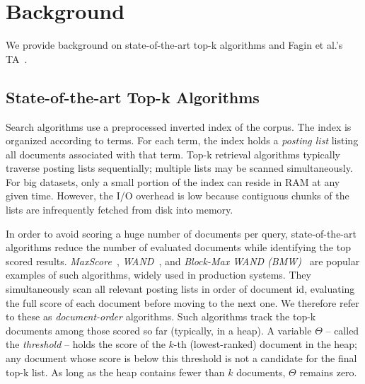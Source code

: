 
\section{Background}
\label{sec:background}

We  provide background on  state-of-the-art top-k algorithms and Fagin et al.'s TA~\cite{Fagin:2003}.

\subsection{State-of-the-art Top-k Algorithms}

Search algorithms use a preprocessed inverted index of the corpus. The index is organized according to terms. For each term, the index holds a \emph{posting list} listing all documents associated with that term. Top-k retrieval algorithms typically traverse  posting lists sequentially; multiple lists may be scanned simultaneously. For big datasets, only a small portion of the index can reside in RAM at any given time. However, the I/O overhead is low because 
contiguous chunks of the lists are infrequently fetched from disk into memory.

In order to avoid scoring a huge number of documents per query, state-of-the-art algorithms reduce the number of evaluated documents while identifying the top scored results. 
{\em MaxScore}~\cite{Strohman:2005,Turtle:1995}, {\em WAND}~\cite{Broder:2003}, and {\em Block-Max WAND (BMW)}~\cite{Ding:2011} are popular examples of such algorithms, 
widely used in production systems. 
They  simultaneously scan all relevant posting lists in order of document id, evaluating the full score of each document before moving to the next one. 
We therefore refer to these as \emph{document-order} algorithms. 
Such algorithms track the top-k documents among those scored so far (typically, in a heap). A variable $\Theta$ -- called the \emph{threshold} -- holds the score of the $k$-th (lowest-ranked) document in the heap;  any document whose  score is below this threshold is not a candidate for the final top-k list. As long as the heap contains fewer than $k$ documents, $\Theta$ remains zero.

